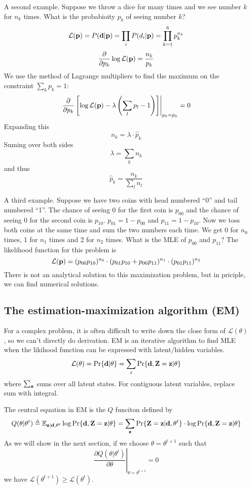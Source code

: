 \documentclass[10pt]{article}
\begin{document}
A second example. Suppose we throw a dice for many times and we see number $k$ for $n_k$ times.
What is the probabioity $p_k$ of seeing number $k$?
$$
\mathcal{L}({\bf p})=P({\bf d}|{\bf p})=\prod_iP(d_i|{\bf p})=\prod_{k=1}^6 p_k^{n_k}
$$
$$
\frac{\partial}{\partial p_k}\log\mathcal{L}({\bf p})=\frac{n_k}{p_k}
$$
We use the method of Lagrange multipliers to find the maximum on the constraint $\sum_kp_k=1$:
$$
\left.\frac{\partial}{\partial p_k}\left[\log\mathcal{L}({\bf p})-\lambda\left(\sum_lp_l-1\right)\right]\right|_{p_k=\hat{p}_k}=0
$$
Expanding this
$$
n_k=\lambda\cdot \hat{p}_k
$$
Suming over both sides
$$
\lambda=\sum_k n_k
$$
and thus
$$
\hat{p}_k = \frac{n_k}{\sum_ln_l}
$$

A third example.
Suppose we have two coins with head numbered ``0'' and tail numbered ``1''.
The chance of seeing 0 for the first coin is $p_{00}$ and the chance of seeing 0 for the second coin is $p_{10}$.
$p_{01}=1-p_{00}$ and $p_{11}=1-p_{10}$.
Now we toss both coins at the same time and sum the two numbers each time.
We get 0 for $n_0$ times, 1 for $n_1$ times and 2 for $n_2$ times.
What is the MLE of $p_{00}$ and $p_{11}$?
The likelihood function for this problem is
$$
\mathcal{L}({\bf p})=(p_{00}p_{10})^{n_0}\cdot(p_{01}p_{10}+p_{00}p_{11})^{n_1}\cdot(p_{01}p_{11})^{n_2}
$$
There is not an analytical solution to this maximization problem,
but in priciple, we can find numerical solutions.

\subsection{The estimation-maximization algorithm (EM)}

For a complex problem, it is often difficult to write down the close form of
$\mathcal{L}(\theta)$, so we can't directly do derivation. EM is an iterative
algorithm to find MLE when the likihood function can be expressed with
latent/hidden variables.
$$
\mathcal{L}(\theta)=\Pr\{{\bf d}|\theta\}=\sum_z\Pr\{{\bf d},{\bf Z}={\bf z}|\theta\}
$$
where $\sum_{\bf z}$ sums over all latent states. For contiguous latent
variables, replace sum with integral.

The central equation in EM is the $Q$ funciton defined by
$$
Q(\theta|\theta^t)\triangleq\mathbb{E}_{{\bf z}|{\bf d},\theta^t}\log\Pr\{{\bf d},{\bf Z}={\bf z}|\theta\}=\sum_{{\bf z}}\Pr\{{\bf Z}={\bf z}|{\bf d},\theta^t\}\cdot\log\Pr\{{\bf d},{\bf Z}={\bf z}|\theta\}
$$
As we will show in the next section, if we choose $\theta=\theta^{t+1}$ such that
$$
\left.\frac{\partial Q(\theta|\theta^t)}{\partial\theta}\right|_{\theta=\theta^{t+1}}=0
$$
we have $\mathcal{L}(\theta^{t+1})\ge\mathcal{L}(\theta^t)$.
\end{document}
